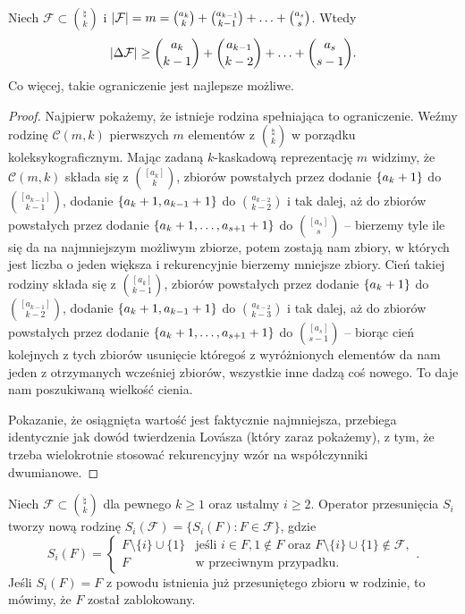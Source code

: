 \begin{theorem}
	Niech \(\mathcal F\subset\binom{\natural}{k}\) i \(\card{\mathcal F} = m =
	\binom{a_k}{k} + \binom{a_{k-1}}{k-1} + \ldots + \binom{a_s}{s}\). Wtedy
	\[\card{\Delta\mathcal F} \ge \binom{a_k}{k-1} + \binom{a_{k-1}}{k-2} +
		\ldots + \binom{a_s}{s-1}.\]
	Co więcej, takie ograniczenie jest najlepsze możliwe.
\end{theorem}
\begin{proof}
	Najpierw pokażemy, że istnieje rodzina spełniająca to ograniczenie. Weźmy
	rodzinę \(\mathcal C(m,k)\) pierwszych \(m\) elementów z \(\binom{\natural}{k}\) w
	porządku koleksykograficznym. Mając zadaną \(k\)-kaskadową reprezentację \(m\)
	widzimy, że \(\mathcal C(m,k)\) składa się z \(\binom{[a_k]}{k}\), zbiorów
	powstałych przez dodanie \(\set{a_k+1}\) do \(\binom{[a_{k-1}]}{k-1}\), dodanie
	\(\set{a_k+1, a_{k-1}+1}\) do \(\binom{a_{k-2}}{k-2}\) i tak dalej, aż do zbiorów
	powstałych przez dodanie \(\set{a_k+1,\ldots,a_{s+1}+1}\) do \(\binom{[a_s]}{s}\)
	-- bierzemy tyle ile się da na najmniejszym możliwym zbiorze, potem zostają
	nam zbiory, w których jest liczba o jeden większa i rekurencyjnie bierzemy
	mniejsze zbiory. Cień takiej rodziny składa się z \(\binom{[a_k]}{k-1}\),
	zbiorów powstałych przez dodanie \(\set{a_k+1}\) do \(\binom{[a_{k-1}]}{k-2}\),
	dodanie \(\set{a_k+1, a_{k-1}+1}\) do \(\binom{a_{k-2}}{k-3}\) i tak dalej, aż do
	zbiorów powstałych przez dodanie \(\set{a_k+1,\ldots,a_{s+1}+1}\) do
	\(\binom{[a_s]}{s-1}\) -- biorąc cień kolejnych z tych zbiorów usunięcie
	któregoś z wyróżnionych elementów da nam jeden z otrzymanych wcześniej
	zbiorów, wszystkie inne dadzą coś nowego. To daje nam poszukiwaną wielkość
	cienia.

	Pokazanie, że osiągnięta wartość jest faktycznie najmniejsza, przebiega
	identycznie jak dowód twierdzenia Lov\'asza (który zaraz pokażemy),
	z tym, że trzeba wielokrotnie stosować rekurencyjny wzór na współczynniki dwumianowe.
\end{proof}

\begin{definition} Niech \(\mathcal F \subset \binom{\natural}{k}\) dla pewnego \(k \geq 1\) oraz ustalmy \(i \geq 2\). Operator przesunięcia \(S_i\) tworzy nową rodzinę \(S_i(\mathcal F) = \{S_i(F) : F \in \mathcal F\}\), gdzie
	\[ S_i(F) =
		\begin{cases}
			F \setminus \{i\} \cup \{1\} & \text{jeśli } i \in F, 1 \notin F \text{ oraz } F \setminus \{i\} \cup \{1\} \notin\mathcal F, \\
			F                            & \text{w przeciwnym przypadku}.
		\end{cases}
		.\]
	Jeśli \(S_i(F)=F\) z powodu istnienia już przesuniętego zbioru w rodzinie, to mówimy, że \(F\) został zablokowany.
\end{definition}

